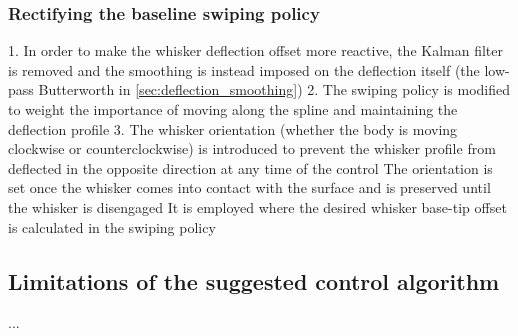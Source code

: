 \subsubsection{Rectifying the baseline swiping policy}
1. In order to make the whisker deflection offset more reactive, the Kalman filter is removed and the smoothing is instead imposed on the deflection itself (the low-pass Butterworth in \ref{sec:deflection_smoothing})
2. The swiping policy is modified to weight the importance of moving along the spline and maintaining the deflection profile
3. The whisker orientation (whether the body is moving clockwise or counterclockwise) is introduced to prevent the whisker profile from deflected in the opposite direction at any time of the control
The orientation is set once the whisker comes into contact with the surface and is preserved until the whisker is disengaged
It is employed where the desired whisker base-tip offset is calculated in the swiping policy

\subsection{Limitations of the suggested control algorithm}
...